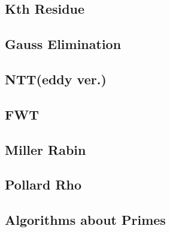 \documentclass[a4paper,10pt,twocolumn,oneside]{article}
\begin{document}
\subsection{Kth Residue}


\subsection{Gauss Elimination}


% 

\subsection{NTT(eddy ver.)}


\subsection{FWT}


\subsection{Miller Rabin}


\subsection{Pollard Rho}


\subsection{Algorithms about Primes}



% 

% 
\end{document}
